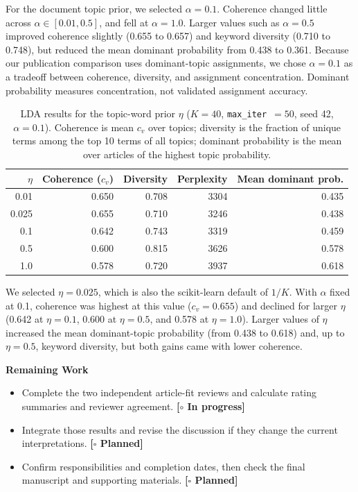 \documentclass[conference]{IEEEtran}
\newcommand{\wip}{\textcolor{orange!70!black}{\textbf{[$\circ$ In progress]}}}
\newcommand{\planned}{\textcolor{blue!60!black}{\textbf{[$\square$ Planned]}}}
\begin{document}
For the document topic prior, we selected $\alpha = 0.1$. Coherence changed little across $\alpha \in [0.01, 0.5]$, and fell at $\alpha = 1.0$. Larger values such as $\alpha = 0.5$ improved coherence slightly (0.655 to 0.657) and keyword diversity (0.710 to 0.748), but reduced the mean dominant probability from 0.438 to 0.361. Because our publication comparison uses dominant-topic assignments, we chose $\alpha = 0.1$ as a tradeoff between coherence, diversity, and assignment concentration. Dominant probability measures concentration, not validated assignment accuracy.

\begin{table}[ht]
\centering
\caption{LDA results for the topic-word prior $\eta$ ($K=40$, \texttt{max\_iter}~$=50$, seed 42, $\alpha = 0.1$). Coherence is mean $c_v$ over topics; diversity is the fraction of unique terms among the top 10 terms of all topics; dominant probability is the mean over articles of the highest topic probability.}
\label{tab:eta}
\setlength{\tabcolsep}{4pt}
\begin{tabular}{rrrrr}
\hline
$\eta$ & Coherence ($c_v$) & Diversity & Perplexity & Mean dominant prob. \\
\hline
0.01  & 0.650 & 0.708 & 3304 & 0.435 \\
0.025 & 0.655 & 0.710 & 3246 & 0.438 \\
0.1   & 0.642 & 0.743 & 3319 & 0.459 \\
0.5   & 0.600 & 0.815 & 3626 & 0.578 \\
1.0   & 0.578 & 0.720 & 3937 & 0.618 \\
\hline
\end{tabular}
\end{table}

We selected $\eta = 0.025$, which is also the scikit-learn default of $1/K$. With $\alpha$ fixed at 0.1, coherence was highest at this value ($c_v = 0.655$) and declined for larger $\eta$ (0.642 at $\eta = 0.1$, 0.600 at $\eta = 0.5$, and 0.578 at $\eta = 1.0$). Larger values of $\eta$ increased the mean dominant-topic probability (from 0.438 to 0.618) and, up to $\eta = 0.5$, keyword diversity, but both gains came with lower coherence. 

\begin{center}\large\textbf{Remaining Work}\end{center}
\begin{itemize}
    \item Complete the two independent article-fit reviews and calculate rating summaries and reviewer agreement. \wip
    \item Integrate those results and revise the discussion if they change the current interpretations. \planned
    \item Confirm responsibilities and completion dates, then check the final manuscript and supporting materials. \planned
\end{itemize}
\end{document}
